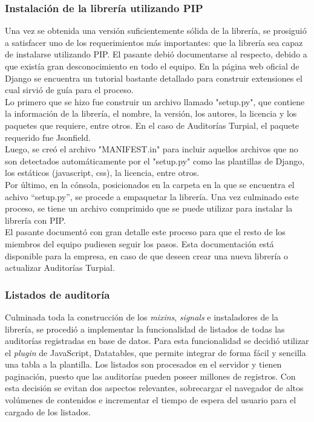 \subsubsection{Instalación de la librería utilizando PIP}

Una vez se obtenida una versión suficientemente sólida de la librería, se prosiguió a satisfacer uno de los requerimientos más importantes: que la librería sea capaz de instalarse  utilizando PIP. El pasante debió documentarse al respecto, debido a que existía gran desconocimiento en todo el equipo. En la página web oficial de Django se encuentra un tutorial bastante detallado para construir extensiones el cual sirvió de guía para el proceso. \\

Lo primero que se hizo fue construir un archivo llamado "setup.py", que contiene la información de la librería, el nombre, la versión, los autores, la licencia y los paquetes que requiere, entre otros. En el caso de Auditorías Turpial, el paquete requerido fue Jsonfield.\\

Luego, se creó el archivo "MANIFEST.in" para incluir aquellos archivos que no son detectados automáticamente por el "setup.py" como las plantillas de Django, los estáticos (javascript, css), la licencia, entre otros. \\

Por último, en la cónsola, posicionados en la carpeta en la que se encuentra el achivo “setup.py”, se procede a empaquetar la librería. Una vez culminado este proceso, se tiene un archivo comprimido que se puede utilizar para instalar la librería con PIP.\\

El pasante documentó con gran detalle este proceso para que el resto de los miembros del equipo pudiesen seguir los pasos. Esta documentación está disponible para la empresa, en caso de que deseen crear una nueva librería o actualizar Auditorías Turpial.

\subsubsection{Listados de auditoría}

Culminada toda la construcción de los \textit{mixins}, \textit{signals} e instaladores de la librería, se procedió a implementar la funcionalidad de listados de todas las auditorías registradas en base de datos. Para esta funcionalidad se decidió utilizar el \textit{plugin} de JavaScript, Datatables, que permite integrar de forma fácil y sencilla una tabla a la plantilla. Los listados son procesados en el servidor y tienen paginación, puesto que las auditorías pueden poseer millones de registros. Con esta decisión se evitan dos aspectos relevantes, sobrecargar el navegador de altos volúmenes de contenidos e incrementar el tiempo de espera del usuario para el cargado de los listados.\\

